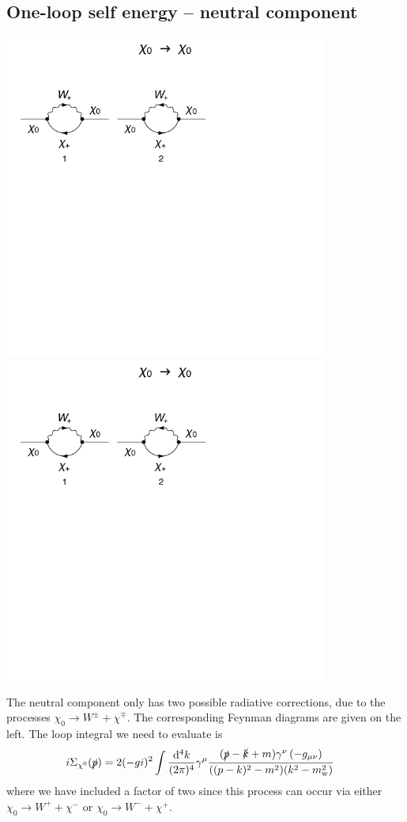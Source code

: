 \documentclass[11pt]{article}
\def\cn{\chi^0}
\renewcommand{\d}{\ensuremath{\operatorname{d}\!}}
\begin{document}
\subsection{One-loop self energy -- neutral component}
\noindent\begin{minipage}{0.3\textwidth}
\includegraphics[width=0.8\textwidth]{1loop_a.pdf}\\
\includegraphics[width=0.8\textwidth]{1loop_b.pdf}
\end{minipage}
\noindent\begin{minipage}{0.7\textwidth}

The neutral component only has two possible radiative corrections, due to the processes $\chi_0\rightarrow W^{\pm} + \chi^{\mp}$.  The corresponding Feynman diagrams are given on the left.  The loop integral we need to evaluate is
\begin{align}
i\Sigma_{\cn}(\slashed{p})&= 2 (-gi)^2 \int \frac{\d^4k}{(2\pi)^4} \gamma^{\mu}\frac{(\slashed{p}-\slashed{k}+m)\gamma^{\nu}\left(-g_{\mu\nu}\right)}{((p-k)^2-m^2)(k^2-m_{\text{w}}^2)}\label{eqn:cn_loop}
\end{align}
where we have included a factor of two since this process can occur via either $\chi_0\rightarrow W^+ + \chi^-$ or $\chi_0\rightarrow W^- + \chi^+$.  
\end{minipage}
\end{document}

